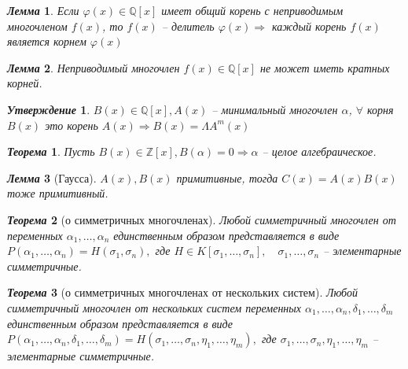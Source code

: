\documentclass[a4paper,12pt]{article}
\newtheorem{teo2}{\textit{Теорема}}
\newtheorem{utv2}{\textit{Утверждение}}
\newtheorem{lem2}{\textit{Лемма}}
\newcommand{\FI}{\varphi}
\newcommand{\AL}{\alpha}
\newcommand{\q}{\quad}
\newcommand{\Ra}{\Rightarrow}
\newcommand{\bb}[1]{\mathbb{#1}}
\begin{document}
\begin{formbox}{}
\begin{lem2} Если $\FI(x)\in\bb{Q}[x]   $ имеет общий корень с неприводимым многочленом $f(x)$, то $f(x)$ -- делитель $\FI(x)\Ra $ каждый корень $f(x)$ является корнем $\FI(x)$
\end{lem2}
\end{formbox}
\begin{formbox}{}
\begin{lem2} Неприводимый многочлен $f(x)\in\bb{Q}[x]$ не может иметь кратных корней.
\end{lem2}
\end{formbox}
\begin{formbox}{}
\begin{utv2} $B(x) \in \bb{Q}[x], A(x) $ -- минимальный многочлен $\AL$, $\forall$ корня $B(x)$ это корень $A(x)\Ra B(x) = \Lambda  A^m(x)$
\end{utv2}
\end{formbox}
\begin{formbox}{}
\begin{teo2} Пусть $B(x) \in \bb{Z}[x], B(\AL) = 0 \Ra \AL$ -- целое алгебраическое.
\end{teo2}
\end{formbox}
\begin{formbox}{}
\begin{lem2}[Гаусса] $A(x),B(x)$ примитивные, тогда $C(x) = A(x)B(x)$ тоже примитивный.
\end{lem2}
\end{formbox}
\begin{formbox}{}
\begin{teo2} [о симметричных многочленах] Любой симметричный многочлен от переменных $\AL_1, \dots, \AL_n$  единственным образом представляется в виде $P(\AL_1,\dots,\AL_n) = H(\sigma_1, \sigma_n),$ где $H\in K[\sigma_1, \dots, \sigma_n], \q \sigma_1, \dots, \sigma_n$ -- элементарные симметричные.
\end{teo2}
\end{formbox}



\begin{formbox}{}
\begin{teo2} [о симметричных многочленах от нескольких систем] Любой симметричный многочлен от нескольких систем переменных $\AL_1, \dots, \AL_n, \delta_1,\dots,\delta_m$  единственным образом представляется в виде $P(\AL_1,\dots,\AL_n,\delta_1,\dots,\delta_m) = H(\sigma_1, \dots, \sigma_n, \eta_1,\dots, \eta_m),$ где $\sigma_1, \dots, \sigma_n, \eta_1,\dots, \eta_m$ -- элементарные симметричные.
\end{teo2}
\end{formbox}
\end{document}
